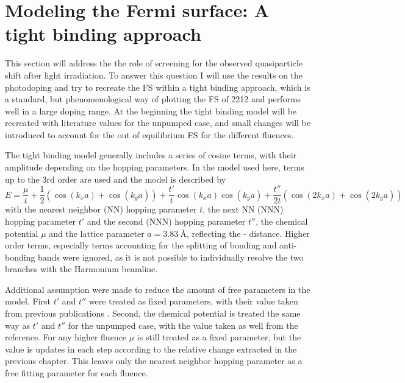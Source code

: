 \section{Modeling the Fermi surface: A tight binding approach}

This section will address the the role of screening for the observed quasiparticle shift after light irradiation.
To answer this question I will use the results on the photodoping and try to recreate the FS within a tight binding approach, which is a standard, but phenomenological way of plotting the FS of 2212 and performs well in a large doping range.
At the beginning the tight binding model will be recreated with literature values for the unpumped case, and small changes will be introduced to account for the out of equilibrium FS for the different fluences.

The tight binding model generally includes a series of cosine terms, with their amplitude depending on the hopping parameters.
In the model used here, terms up to the 3rd order are used and the model is described by
\begin{equation}
	E = \frac{\mu}{t} + \frac{1}{2} \left(\cos(k_xa)+\cos(k_ya)\right) + \frac{t'}{t} \cos(k_xa)\cos(k_ya) + \frac{t''}{2t} \left(\cos(2k_xa)+\cos(2k_ya)\right)
\end{equation}
with the nearest neighbor (NN) hopping parameter $t$, the next NN (NNN) hopping parameter $t'$ and the second (NNN) hopping parameter $t''$, the chemical potential $\mu$ and the lattice parameter $a=\qty{3.83}{\angstrom}$, reflecting the - distance.
Higher order terms, especially terms accounting for the splitting of bonding and anti-bonding bands were ignored, as it is not possible to individually resolve the two branches with the Harmonium beamline.

Additional assumption were made to reduce the amount of free parameters in the model.
First $t'$ and $t''$ were treated as fixed parameters, with their value taken from previous publications \cite{}.
Second, the chemical potential is treated the same way as $t'$ and $t''$ for the unpumped case, with the value taken as well from the reference.
For any higher fluence $\mu$ is still treated as a fixed parameter, but the value is updates in each step according to the relative change extracted in the previous chapter.
This leaves only the nearest neighbor hopping parameter as a free fitting parameter for each fluence.

